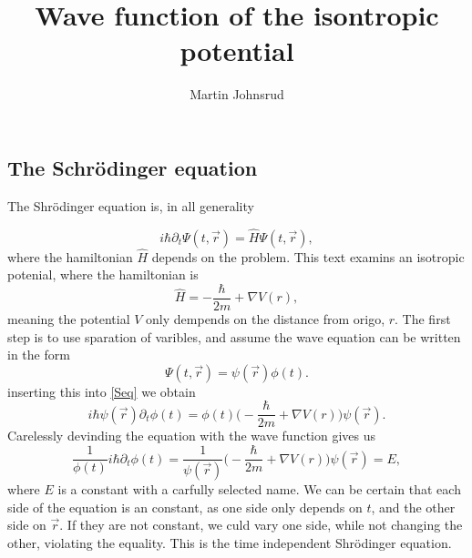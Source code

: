 \documentclass{article}
\title{Wave function of the isontropic potential}
\author{Martin Johnsrud}
\begin{document}
    \maketitle

    \subsection*{The Schrödinger equation}

        The Shrödinger equation is, in all generality 

        \begin{equation}
            \label{Seq}
            i \hbar \partial_t \Psi(t, \vec r) = \hat H \Psi(t, \vec r), 
        \end{equation}
        where the hamiltonian \(\hat H\) depends on the problem. This text examins an isotropic potenial, where the hamiltonian is
        \begin{equation}
            \hat H = -\frac{\hbar}{2 m} + \nabla V(r), 
        \end{equation}
        meaning the potential \(V\) only dempends on the distance from origo, \(r\). The first step is to use sparation of varibles, and assume the wave equation can be written in the form
        \begin{equation*}
            \Psi(t, \vec r) = \psi(\vec r)\phi(t).
        \end{equation*}
        inserting this into \eqref{Seq} we obtain
        \begin{equation*}
            i \hbar \psi(\vec r) \partial_t \phi(t) = \phi(t) \Big(-\frac{\hbar}{2 m} + \nabla V(r) \Big) \psi(\vec r).         
        \end{equation*}
        Carelessly devinding the equation with the wave function gives us
        \begin{equation}
            \label{Separated Seq}
            \frac{1}{\phi(t)} i \hbar \partial_t \phi(t) = \frac{1}{\psi(\vec r)}\Big(-\frac{\hbar}{2 m} + \nabla V(r) \Big) \psi(\vec r) = E,
        \end{equation}
        where \(E\) is a constant with a carfully selected name. We can be certain that each side of the equation is an constant, as one side only depends on \(t\), and the other side on \(\vec r\). If they are not constant, we culd vary one side, while not changing the other, violating the equality. This is the time independent Shrödinger equation.
\end{document}
